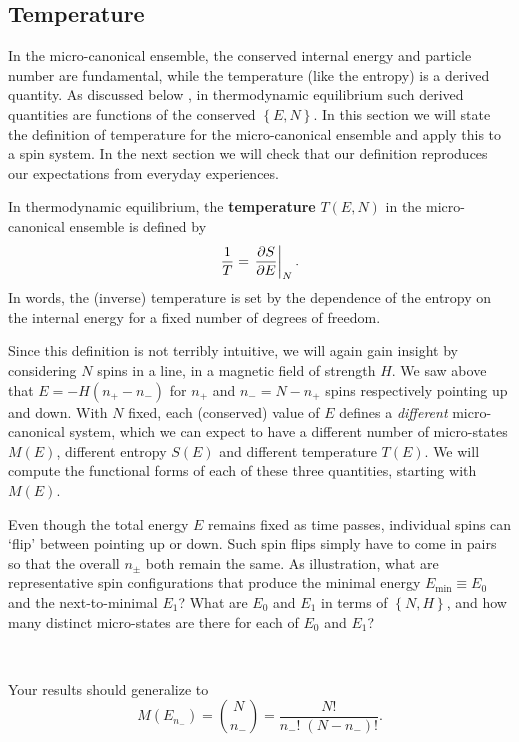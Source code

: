 \subsection{\label{sec:temp}Temperature}
In the micro-canonical ensemble, the conserved internal energy and particle number are fundamental, while the temperature (like the entropy) is a derived quantity.
As discussed below , in thermodynamic equilibrium such derived quantities are functions of the conserved $\left\{E, N\right\}$.
In this section we will state the definition of temperature for the micro-canonical ensemble and apply this to a spin system.
In the next section we will check that our definition reproduces our expectations from everyday experiences.

\begin{shaded}
  In thermodynamic equilibrium, the \textbf{temperature} $T(E, N)$ in the micro-canonical ensemble is defined by
  \begin{equation}
    \label{eq:temperature}
    \frac{1}{T} = \left. \frac{\partial S}{\partial E}\right|_N.
  \end{equation}
  In words, the (inverse) temperature is set by the dependence of the entropy on the internal energy for a fixed number of degrees of freedom.
\end{shaded}

Since this definition is not terribly intuitive, we will again gain insight by considering $N$ spins in a line, in a magnetic field of strength $H$.
We saw above that $E = -H(n_+ - n_-)$ for $n_+$ and $n_- = N - n_+$ spins respectively pointing up and down.
With $N$ fixed, each (conserved) value of $E$ defines a \textit{different} micro-canonical system, which we can expect to have a different number of micro-states $M(E)$, different entropy $S(E)$ and different temperature $T(E)$.
We will compute the functional forms of each of these three quantities, starting with $M(E)$.

Even though the total energy $E$ remains fixed as time passes, individual spins can `flip' between pointing up or down.
Such spin flips simply have to come in pairs so that the overall $n_{\pm}$ both remain the same.
As illustration, what are representative spin configurations that produce the minimal energy $E_{\text{min}} \equiv E_0$ and the next-to-minimal $E_1$?
What are $E_0$ and $E_1$ in terms of $\left\{N, H\right\}$, and how many distinct micro-states are there for each of $E_0$ and $E_1$?
\begin{mdframed}
  \ \\[100 pt]
\end{mdframed}
Your results should generalize to
\begin{equation}
  \label{eq:spin_states}
  M(E_{n_-}) = \binom{N}{n_-} = \frac{N!}{n_-! \; (N - n_-)!}.
\end{equation}

